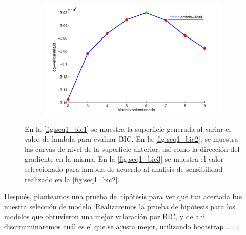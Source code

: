 \begin{figure}[H]
\begin{subfigure}[b]{0.75\textwidth}
    \includegraphics[width=\textwidth]{gfx/chap6/cuervobic3} 
    \caption{}
    \label{fig:seq1_bic3}
  \end{subfigure}
  \caption{En la \autoref{fig:seq1_bic1} se muestra la superficie generada al variar el valor de lambda para evaluar BIC. En la \autoref{fig:seq1_bic2}, se muestra las curvas de nivel de la superficie anterior, así como la dirección del gradiente en la misma. En la \autoref{fig:seq1_bic3} se muestra el valor seleccionado para lambda de acuerdo al analisis de sensibilidad realizado en la \autoref{fig:seq1_bic2}.}
  \label{fig:seq1_bic}
\end{figure}

Después, planteamos una prueba de hipótesis para ver qué tan acertada fue nuestra selección de modelo. Realizaremos la prueba de hipótesis para los modelos que obtuvieron una mejor valoración por BIC, y de ahi discrmiminaremos cuál es el que se ajusta mejor, utilizando bootstrap .... .

